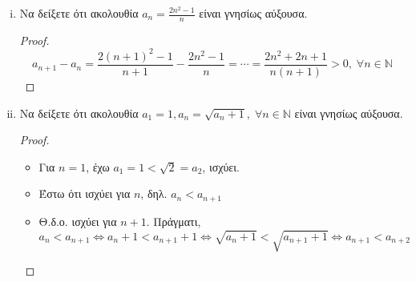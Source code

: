 \begin{enumerate}
\begin{enumerate}[i)]
            \item Να δείξετε ότι ακολουθία $ a_{n} = \frac{2n^{2}-1}{n} $ είναι γνησίως 
                αύξουσα.

                \begin{proof}
                    \[
                        a_{n+1}- a_{n} = \frac{2(n+1)^{2}-1}{n+1} - \frac{2n^{2}-1}{n} 
                        = \cdots = \frac{2n^{2}+2n+1}{n(n+1)} >0, \; \forall n 
                        \in \mathbb{N}
                    \] 
                \end{proof}

            \item Να δείξετε ότι ακολουθία $ a_{1}=1, a_{n} = \sqrt{a_{n}+1}, \; 
                \forall n \in \mathbb{N}$ είναι γνησίως αύξουσα.

                \begin{proof}
                    \begin{itemize}
                        \item Για $ n=1 $, έχω $ a_{1}=1 < \sqrt{2} = a_{2} $, ισχύει.
                        \item Έστω ότι ισχύει για $n$, δηλ. $ a_{n}< a_{n+1} $
                        \item Θ.δ.ο. ισχύει για $ n+1 $. Πράγματι,
                            \[
                                a_{n} < a_{n+1} \Leftrightarrow a_{n}+1 < a_{n+1}+1 
                                \Leftrightarrow \sqrt{a_{n}+1} < \sqrt{a_{n+1}+1} 
                                \Leftrightarrow a_{n+1}< a_{n+2}
                            \] 
                    \end{itemize}
                \end{proof}

        \end{enumerate}
\end{enumerate}






